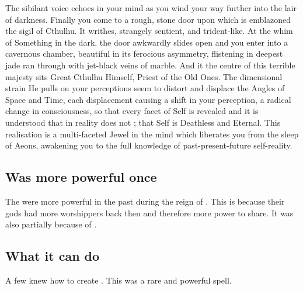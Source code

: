{  The sibilant voice echoes in your mind as you wind your way further into the lair of darkness.
  Finally you come to a rough, stone door upon which is emblazoned the sigil of Cthulhu. 
  It writhes, strangely sentient, and trident-like.
  At the whim of Something in the dark, the door awkwardly slides open and you enter into a cavernous chamber, beautiful in its ferocious asymmetry, flistening in deepest jade ran through with jet-black veins of marble.
  And it the centre of this terrible majesty sits Great Cthulhu Himself, Priest of the Old Ones.
  The dimensional strain He pulls on your perceptions seem to distort and displace the Angles of Space and Time, each displacement causing a shift in your perception, a radical change in consciousness, so that every facet of Self is revealed and it is understood that in reality  does not ; that Self is Deathless and Eternal.
  This realisation is a multi-faceted Jewel in the mind which liberates you from the sleep of Aeons, awakening you to the full knowledge of past-present-future self-reality.
}









\subsection{Was more powerful once}
The \rethyaxes{} were more powerful in the past during the reign of \Ortaica. 
This is because their gods had more worshippers back then and therefore more power to share. 
It was also partially because of . 









\subsection{What it can do}
A few \rethyaxes knew how to create .
This was a rare and powerful spell.























